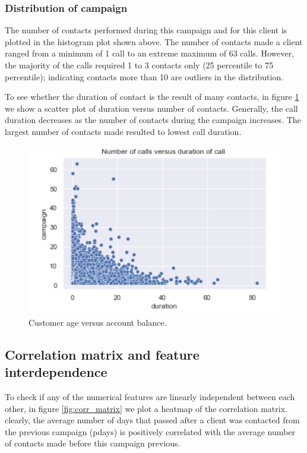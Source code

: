 \subsubsection*{Distribution of campaign}
The number of contacts performed during this campaign and for this client is plotted in the histogram plot shown above. The number of contacts made a client ranged from a minimum of 1 call to an extreme maximum of 63 calls. However, the majority of the calls required 1 to 3 contacts only (25 percentile to 75 percentile); indicating contacts more than 10 are outliers in the distribution.

To see whether the duration of contact is the result of many contacts, in figure \ref{fig:duration_campaign_scatter} we show a scatter plot of duration versus number of contacts. Generally, the call duration decreases as the number of contacts during the campaign increases. The largest number of contacts made resulted to lowest call duration. 

\begin{figure}[tbh]
\centering
\includegraphics[width = 0.8\hsize]{./resources/img/fig_duration_campaign_scatter.png}
\caption{Customer age versus account balance.} 
\label{fig:duration_campaign_scatter}
\end{figure}

\subsection{Correlation matrix and feature interdependence}
To check if any of the numerical features are linearly independent between each other, in figure \ref{fig:corr_matrix} we plot a heatmap of the correlation matrix.  clearly, the average number of days that passed after a client was contacted from the previous campaign (pdays) is positively correlated with the average number of contacts made before this campaign previous.

